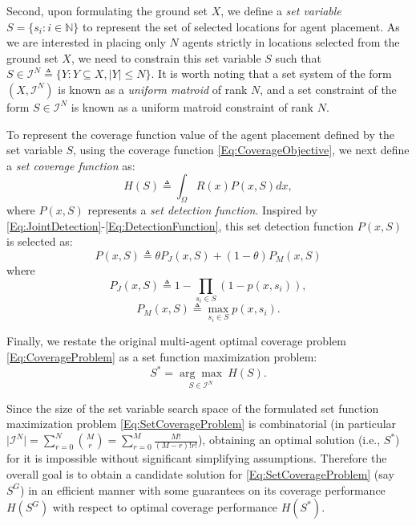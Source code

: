 \documentclass[letterpaper, 10 pt, conference]{ieeeconf}
\newcommand{\N}{\mathbb{N}}
\begin{document}
Second, upon formulating the ground set $X$, we define a \emph{set variable} $S = \{s_i:i\in\N\}$ to represent the set of selected locations for agent placement. As we are interested in placing only $N$ agents strictly in locations selected from the ground set $X$, we need to constrain this set variable $S$ such that $S \in \mathcal{I}^N \triangleq \{Y: Y \subseteq X, \vert Y \vert \leq N\}$. It is worth noting that a set system of the form $(X,\mathcal{I}^N)$ is known as a \emph{uniform matroid} of rank $N$, and a set constraint of the form $S\in\mathcal{I}^N$ is known as a uniform matroid constraint of rank $N$. 

To represent the coverage function value of the agent placement defined by the set variable $S$, using the coverage function \eqref{Eq:CoverageObjective}, we next define a \emph{set coverage function} as: 
\begin{equation}\label{Eq:SetCoverageFunction}
    H(S) \triangleq \int_\Omega R(x)P(x,S)dx,
\end{equation}
where $P(x,S)$ represents a \emph{set detection function}. Inspired by \eqref{Eq:JointDetection}-\eqref{Eq:DetectionFunction}, this set detection function $P(x,S)$ is selected as:
\begin{equation}\label{Eq:SetDetectionFunction}
P(x,S) \triangleq \theta P_J(x,S) + (1-\theta)P_M(x,S)
\end{equation}
where 
\begin{equation}\label{Eq:SetJointDetection}
P_J(x,S) \triangleq 1-\prod_{s_i\in S}(1-p(x,s_i)),
\end{equation}
\begin{equation}\label{Eq:SetMaxDetection}
P_M(x,S) \triangleq \max_{s_i\in S} p(x,s_i).    
\end{equation}


Finally, we restate the original multi-agent optimal coverage problem \eqref{Eq:CoverageProblem} as a set function maximization problem:
\begin{equation}\label{Eq:SetCoverageProblem}
S^* = \underset{S\in\mathcal{I}^N}{\arg\max}\ H(S).
\end{equation}

Since the size of the set variable search space of the formulated set function maximization problem \eqref{Eq:SetCoverageProblem} is combinatorial (in particular $\vert \mathcal{I}^N \vert = \sum_{r=0}^N {M \choose r} =  \sum_{r=0}^M \frac{M!}{(M-r)!r!}$), obtaining an optimal solution (i.e., $S^*$) for it is impossible without significant simplifying assumptions. Therefore the overall goal is to obtain a candidate solution for \eqref{Eq:SetCoverageProblem} (say $S^G$) in an efficient manner with some guarantees on its coverage performance $H(S^G)$ with respect to optimal coverage performance $H(S^*)$. 
\end{document}
